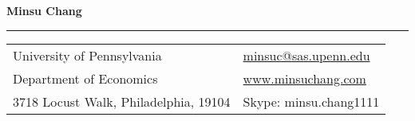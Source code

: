 \documentclass[letterpaper,11pt,oneside]{article}
\newcommand*{\Skype}{\href{skype:minsu.chang1111?add}{minsu.chang1111}}
\newcommand{\Absender}[1][\normalsize]{\Skype}
\begin{document}

\noindent  \LARGE{\textbf{Minsu Chang}}  \\
\vspace{-1ex}
\hrule
\normalsize


\begin{center}
\begin{tabular}{l l}
 University of Pennsylvania    & \hspace{1in} \href{mailto:minsuc@sas.upenn.edu}{minsuc@sas.upenn.edu} \\
 Department of Economics    & \hspace{1in}  \href{www.minsuchang.com}{www.minsuchang.com}   \\
 3718 Locust Walk, Philadelphia, 19104              & \hspace{1in} Skype: minsu.chang1111 \\%
\end{tabular}
\end{center}

\vspace{1em}

\end{document}
